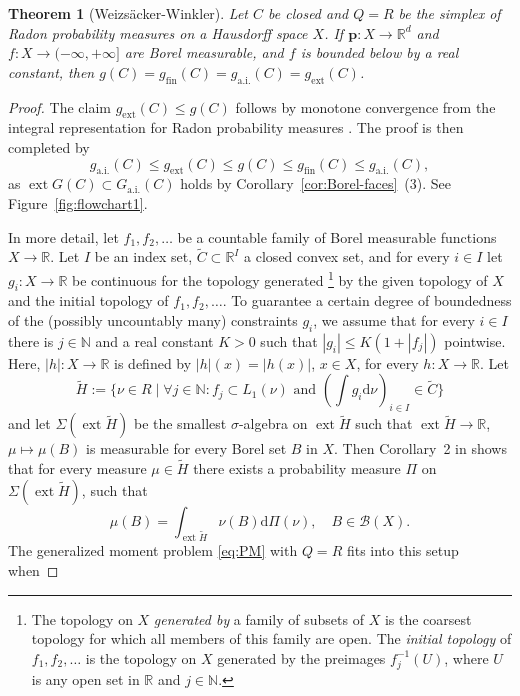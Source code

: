 \documentclass[a4paper,11pt,reqno]{amsart}
\numberwithin{equation}{section}
\theoremstyle{plain}
\newtheorem{theorem}{Theorem}[section]
\theoremstyle{definition}
\newcommand{\bp}{\mathbf{p}}
\newcommand{\cB}{\mathcal{B}} %
\newcommand{\dd}{\mathrm{d}} %
\newcommand{\N}{\mathbb{N}} %
\newcommand{\R}{\mathbb{R}} %
\DeclareMathOperator{\ext}{ext} %
\newcommand\ait{\mathrm{a.i.}}
\newcommand\extt{\mathrm{ext}}
\newcommand\fint{\mathrm{fin}}
\begin{document}
%
\begin{theorem}[Weizs\"{a}cker-Winkler]\label{thm:WW-integral}
Let $C$ be closed and $Q=R$ be the simplex of Radon probability measures on a Hausdorff 
space $X$. If $\bp\colon X\to\R^d$ and $f\colon X\to(-\infty,+\infty]$ are Borel measurable, 
and $f$ is bounded below by a real constant, then $g(C)=g_\fint(C)=g_\ait(C)=g_\extt(C)$.
\end{theorem}
%
\begin{proof}
The claim $g_\extt(C)\leq g(C)$ follows by monotone convergence from the integral 
representation for Radon probability measures \cite{weizsaecker-winkler79}. The proof is then 
completed by 
\[
g_\ait(C)\leq g_\extt(C)\leq g(C)\leq g_\fint(C)\leq g_\ait(C),
\]
as $\ext G(C)\subset G_\ait(C)$ holds by Corollary~\ref{cor:Borel-faces}~(3).
See Figure~\ref{fig:flowchart1}.
\par
%
In more detail, let $f_1,f_2,\dots$ be a countable family of Borel measurable functions 
$X\to\R$. Let $I$ be an index set, $\tilde C\subset\R^I$ a closed convex set, and for 
every $i\in I$ let $g_i\colon X\to\R$ be continuous for the topology generated%
%
\footnote{%
The topology on $X$ \emph{generated by} a family of subsets of $X$ is the coarsest 
topology for which all members of this family are open. The \emph{initial topology} of 
$f_1,f_2,\dots$ is the topology on $X$ generated by the preimages $f_j^{-1}(U)$, where 
$U$ is any open set in $\R$ and $j\in\N$.}
%
by the given topology of $X$ and the initial topology of $f_1,f_2,\dots$. To guarantee a 
certain degree of boundedness of the (possibly uncountably many) constraints $g_i$, we 
assume that for every $i\in I$ there is $j\in\N$ and a real constant $K>0$ such that 
$|g_i|\leq K(1+|f_j|)$ pointwise. Here, $|h|\colon X\to\R$ is defined by $|h|(x)=|h(x)|$, 
$x\in X$, for every $h\colon X\to\R$. Let
\[\textstyle
\tilde H:=\{\nu\in R \mid
\text{$\forall j\in\N:f_j\subset L_1(\nu)$ 
and 
$(\int g_i\dd\nu)_{i\in I}\in\tilde C$} \}
\]
and let $\Sigma(\ext\tilde H)$ be the smallest $\sigma$-algebra on $\ext\tilde H$ such that 
$\ext\tilde H\to\R$, $\mu\mapsto\mu(B)$ is measurable for every Borel set $B$ in $X$. Then 
Corollary~2 in \cite{weizsaecker-winkler79} shows that for every measure $\mu\in\tilde H$ 
there exists a probability measure $\Pi$ on $\Sigma(\ext\tilde H)$, such that
\begin{equation}\label{eq:measure}\textstyle
\mu(B)=\int_{\ext\tilde H} \nu(B)\dd\Pi(\nu),
\quad B\in\cB(X).
\end{equation}
The generalized moment problem \eqref{eq:PM} with $Q=R$ fits into this setup when 

\end{proof}
\end{document}
